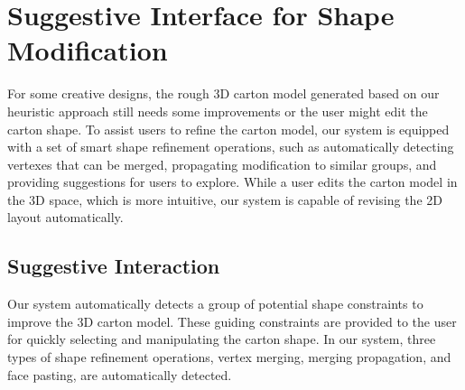\section{Suggestive Interface for Shape Modification }\label{sec:interaction}
%
For some creative designs, the rough 3D carton model generated based on our heuristic approach still needs some improvements or the user might edit the carton shape. 
To assist users to refine the carton model, our system is equipped with a set of smart shape refinement operations, such as automatically detecting vertexes that can be merged, propagating modification to similar groups, and providing suggestions for users to explore. 
%
While a user edits the carton model in the 3D space, which is more intuitive, our system is capable of revising the 2D layout automatically. 



\subsection{Suggestive Interaction}

Our system automatically detects a group of potential shape constraints to improve the 3D carton model.
%
These guiding constraints are provided to the user for quickly selecting and manipulating the carton shape.
In our system, three types of shape refinement operations, vertex merging, merging propagation, and face pasting, are automatically detected.

%

